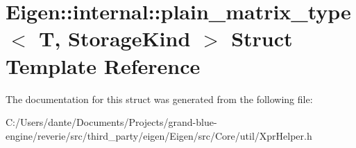 \hypertarget{struct_eigen_1_1internal_1_1plain__matrix__type}{}\section{Eigen\+::internal\+::plain\+\_\+matrix\+\_\+type$<$ T, Storage\+Kind $>$ Struct Template Reference}
\label{struct_eigen_1_1internal_1_1plain__matrix__type}


The documentation for this struct was generated from the following file\+:\begin{DoxyCompactItemize}
\item 
C\+:/\+Users/dante/\+Documents/\+Projects/grand-\/blue-\/engine/reverie/src/third\+\_\+party/eigen/\+Eigen/src/\+Core/util/Xpr\+Helper.\+h\end{DoxyCompactItemize}
